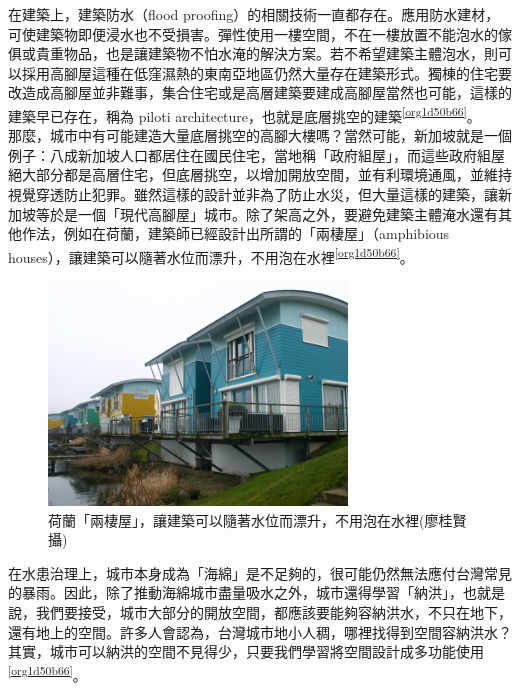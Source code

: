 \documentclass[a4paper,12pt]{article}
\begin{document}
在建築上，建築防水（flood proofing）的相關技術一直都存在。應用防水建材，可使建築物即便浸水也不受損害。彈性使用一樓空間，不在一樓放置不能泡水的傢俱或貴重物品，也是讓建築物不怕水淹的解決方案。若不希望建築主體泡水，則可以採用高腳屋這種在低窪濕熱的東南亞地區仍然大量存在建築形式。獨棟的住宅要改造成高腳屋並非難事，集合住宅或是高層建築要建成高腳屋當然也可能，這樣的建築早已存在，稱為 piloti architecture，也就是底層挑空的建築\textsuperscript{\ref{org1d50b66}}。\\

那麼，城市中有可能建造大量底層挑空的高腳大樓嗎？當然可能，新加坡就是一個例子：八成新加坡人口都居住在國民住宅，當地稱「政府組屋」，而這些政府組屋絕大部分都是高層住宅，但底層挑空，以增加開放空間，並有利環境通風，並維持視覺穿透防止犯罪。雖然這樣的設計並非為了防止水災，但大量這樣的建築，讓新加坡等於是一個「現代高腳屋」城市。除了架高之外，要避免建築主體淹水還有其他作法，例如在荷蘭，建築師已經設計出所謂的「兩棲屋」（amphibious houses），讓建築可以隨著水位而漂升，不用泡在水裡\textsuperscript{\ref{org1d50b66}}。\\

\begin{figure}[htbp]
\centering
\includegraphics[width=300]{images/161236830092580_P3592755.png}
\caption{\label{fig:FigName}荷蘭「兩棲屋」，讓建築可以隨著水位而漂升，不用泡在水裡(廖桂賢攝)}
\end{figure}

在水患治理上，城市本身成為「海綿」是不足夠的，很可能仍然無法應付台灣常見的暴雨。因此，除了推動海綿城市盡量吸水之外，城市還得學習「納洪」，也就是說，我們要接受，城市大部分的開放空間，都應該要能夠容納洪水，不只在地下，還有地上的空間。許多人會認為，台灣城市地小人稠，哪裡找得到空間容納洪水？其實，城市可以納洪的空間不見得少，只要我們學習將空間設計成多功能使用\textsuperscript{\ref{org1d50b66}}。\\
\end{document}
